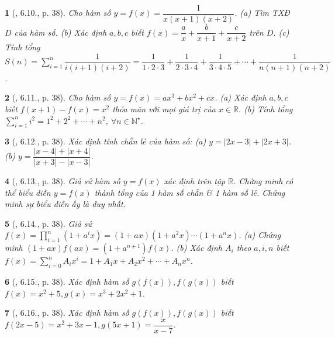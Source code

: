 \documentclass{article}
\newtheorem{baitoan}{}
\begin{document}
\begin{baitoan}[\cite{TLCT_THCS_Toan_9_dai_so}, 6.10., p. 38]
	Cho hàm số $y = f(x) = \dfrac{1}{x(x + 1)(x + 2)}$. (a) Tìm {\rm TXĐ} $D$ của hàm số. (b) Xác định $a,b,c$ biết $f(x) = \dfrac{a}{x} + \dfrac{b}{x + 1} + \dfrac{c}{x + 2}$ trên $D$. (c) Tính tổng $S(n) = \sum_{i=1}^n \dfrac{1}{i(i + 1)(i + 2)} = \dfrac{1}{1\cdot2\cdot3} + \dfrac{1}{2\cdot3\cdot4} + \dfrac{1}{3\cdot4\cdot5} + \cdots + \dfrac{1}{n(n + 1)(n + 2)}$.
\end{baitoan}

\begin{baitoan}[\cite{TLCT_THCS_Toan_9_dai_so}, 6.11., p. 38]
	Cho hàm số $y = f(x) = ax^3 + bx^2 + cx$. (a) Xác định $a,b,c$ biết $f(x + 1) - f(x) = x^2$ thỏa mãn với mọi giá trị của $x\in\mathbb{R}$. (b) Tính tổng $\sum_{i=1}^n i^2 = 1^2 + 2^2 + \cdots + n^2$, $\forall n\in\mathbb{N}^\star$.
\end{baitoan}

\begin{baitoan}[\cite{TLCT_THCS_Toan_9_dai_so}, 6.12., p. 38]
	Xác định tính chẵn lẻ của hàm số: (a) $y = |2x - 3| + |2x + 3|$. (b) $y = \dfrac{|x - 4| + |x + 4|}{|x + 3| - |x - 3|}$.
\end{baitoan}

\begin{baitoan}[\cite{TLCT_THCS_Toan_9_dai_so}, 6.13., p. 38]
	Giả sử hàm số $y = f(x)$ xác định trên tập $\mathbb{R}$. Chứng minh có thể biểu diễn $y = f(x)$ thành tổng của 1 hàm số chẵn \& 1 hàm số lẻ. Chứng minh sự biểu diễn ấy là duy nhất.
\end{baitoan}

\begin{baitoan}[\cite{TLCT_THCS_Toan_9_dai_so}, 6.14., p. 38]
	Giả sử $f(x) = \prod_{i=1}^n (1 + a^ix) = (1 + ax)(1 + a^2x)\cdots(1 + a^nx)$. (a) Chứng minh $(1 + ax)f(ax) = (1 + a^{n+1})f(x)$. (b) Xác định $A_i$ theo $a,i,n$ biết $f(x) = \sum_{i=0}^n A_ix^i = 1 + A_1x + A_2x^2 + \cdots + A_nx^n$.
\end{baitoan}

\begin{baitoan}[\cite{TLCT_THCS_Toan_9_dai_so}, 6.15., p. 38]
	Xác định hàm số $g(f(x)),f(g(x))$ biết $f(x) = x^2 + 5,g(x) = x^3 + 2x^2 + 1$.
\end{baitoan}

\begin{baitoan}[\cite{TLCT_THCS_Toan_9_dai_so}, 6.16., p. 38]
	Xác định hàm số $g(f(x)),f(g(x))$ biết $f(2x - 5) = x^2 + 3x - 1,g(5x + 1) = \dfrac{x}{x - 7}$.
\end{baitoan}
\end{document}
